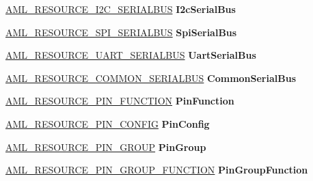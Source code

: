 \begin{DoxyCompactItemize}
\mbox{\label{unionaml__resource_a4d18a18ba47aeb015c8514bd4b6cbd67}} 
\hyperlink{structaml__resource__i2c__serialbus}{A\+M\+L\+\_\+\+R\+E\+S\+O\+U\+R\+C\+E\+\_\+\+I2\+C\+\_\+\+S\+E\+R\+I\+A\+L\+B\+US} {\bfseries I2c\+Serial\+Bus}
\item 
\mbox{\label{unionaml__resource_a7e5074ac4e198fd90fedcc96e09024e5}} 
\hyperlink{structaml__resource__spi__serialbus}{A\+M\+L\+\_\+\+R\+E\+S\+O\+U\+R\+C\+E\+\_\+\+S\+P\+I\+\_\+\+S\+E\+R\+I\+A\+L\+B\+US} {\bfseries Spi\+Serial\+Bus}
\item 
\mbox{\label{unionaml__resource_a5a429e6f75b18dee5c55c3ca34edf863}} 
\hyperlink{structaml__resource__uart__serialbus}{A\+M\+L\+\_\+\+R\+E\+S\+O\+U\+R\+C\+E\+\_\+\+U\+A\+R\+T\+\_\+\+S\+E\+R\+I\+A\+L\+B\+US} {\bfseries Uart\+Serial\+Bus}
\item 
\mbox{\label{unionaml__resource_ada547867a653baa1a41279832b3d96f7}} 
\hyperlink{structaml__resource__common__serialbus}{A\+M\+L\+\_\+\+R\+E\+S\+O\+U\+R\+C\+E\+\_\+\+C\+O\+M\+M\+O\+N\+\_\+\+S\+E\+R\+I\+A\+L\+B\+US} {\bfseries Common\+Serial\+Bus}
\item 
\mbox{\label{unionaml__resource_af6acf5c3b0eb8d9dea31e8130e10db87}} 
\hyperlink{structaml__resource__pin__function}{A\+M\+L\+\_\+\+R\+E\+S\+O\+U\+R\+C\+E\+\_\+\+P\+I\+N\+\_\+\+F\+U\+N\+C\+T\+I\+ON} {\bfseries Pin\+Function}
\item 
\mbox{\label{unionaml__resource_a00c092ea48e8102c9a8767e3acc325b2}} 
\hyperlink{structaml__resource__pin__config}{A\+M\+L\+\_\+\+R\+E\+S\+O\+U\+R\+C\+E\+\_\+\+P\+I\+N\+\_\+\+C\+O\+N\+F\+IG} {\bfseries Pin\+Config}
\item 
\mbox{\label{unionaml__resource_a17a4b6433fffd475cca05201f1ab7886}} 
\hyperlink{structaml__resource__pin__group}{A\+M\+L\+\_\+\+R\+E\+S\+O\+U\+R\+C\+E\+\_\+\+P\+I\+N\+\_\+\+G\+R\+O\+UP} {\bfseries Pin\+Group}
\item 
\mbox{\label{unionaml__resource_a3fd3c66e233fa0a19182964009172a17}} 
\hyperlink{structaml__resource__pin__group__function}{A\+M\+L\+\_\+\+R\+E\+S\+O\+U\+R\+C\+E\+\_\+\+P\+I\+N\+\_\+\+G\+R\+O\+U\+P\+\_\+\+F\+U\+N\+C\+T\+I\+ON} {\bfseries Pin\+Group\+Function}

\end{DoxyCompactItemize}
